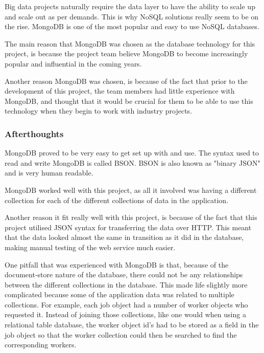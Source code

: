 \bigskip

Big data projects naturally require the data layer to have the ability to scale up and scale out as per demands. This is why NoSQL solutions really seem to be on the rise. MongoDB is one of the most popular and easy to use NoSQL databases.

\bigskip

The main reason that MongoDB was chosen as the database technology for this project, is because the project team believe MongoDB to become increasingly popular and influential in the coming years.

\bigskip
Another reason MongoDB was chosen, is because of the fact that prior to the development of this project, the team members had little experience with MongoDB, and thought that it would be crucial for them to be able to use this technology when they begin to work with industry projects.

\subsubsection{Afterthoughts}
MongoDB proved to be very easy to get set up with and use. The syntax used to read and write MongoDB is called BSON. BSON is also known as "binary JSON" and is very human readable.

\bigskip
MongoDB worked well with this project, as all it involved was having a different collection for each of the different collections of data in the application. 

Another reason it fit really well with this project, is because of the fact that this project utilised JSON syntax for transferring the data over HTTP. This meant that the data looked almost the same in transition as it did in the database, making manual testing of the web service much easier.

\bigskip

One pitfall that was experienced with MongoDB is that, because of the document-store nature of the database, there could not be any relationships between the different collections in the database. This made life slightly more complicated because some of the application data was related to multiple collections. For example, each job object had a number of worker objects who requested it. Instead of joining those collections, like one would when using a relational table database, the worker object id's had to be stored as a field in the job object so that the worker collection could then be searched to find the corresponding workers. 

